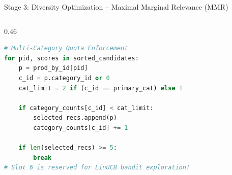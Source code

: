 \documentclass[10pt]{beamer}
\begin{document}
\begin{frame}[fragile]{Stage 3: Diversity Optimization -- Maximal Marginal Relevance (MMR)}
\begin{columns}[T]
\begin{column}{0.46\textwidth}
\begin{lstlisting}[language=Python]
# Multi-Category Quota Enforcement
for pid, scores in sorted_candidates:
    p = prod_by_id[pid]
    c_id = p.category_id or 0
    cat_limit = 2 if (c_id == primary_cat) else 1
    
    if category_counts[c_id] < cat_limit:
        selected_recs.append(p)
        category_counts[c_id] += 1
        
    if len(selected_recs) >= 5:
        break
# Slot 6 is reserved for LinUCB bandit exploration!
\end{lstlisting}
    \end{column}
\end{columns}
\end{frame}

\end{document}
